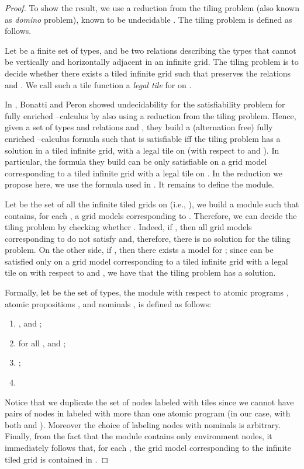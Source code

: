\documentclass{LMCS}
\theoremstyle{plain}
\begin{document}
\begin{proof}
To show the result, we use a reduction from the tiling problem (also known as
\emph{domino} problem), known to be undecidable \cite{Ber66}. The tiling
problem is defined as follows.

Let  be a finite set of types, and  be two relations
describing the types that cannot be vertically and horizontally adjacent in an
infinite grid. The tiling problem is to decide whether there exists a tiled
infinite grid  such that  preserves the
relations  and . We call such a tile function a \emph{legal tile} for 
on .

In \cite{BP04}, Bonatti and Peron showed undecidability for the satisfiability
problem for fully enriched --calculus by also using a reduction from the
tiling problem. Hence, given a set of types  and relations  and , they
build a (alternation free) fully enriched --calculus formula 
such that  is satisfiable iff the tiling problem has a solution in a
tiled infinite grid, with a legal tile  on  (with respect to  and
). In particular, the formula they build can be only satisfiable on a grid
model  corresponding to a tiled infinite grid with a legal tile  on
. In the reduction we propose here, we use the formula  used in
\cite{BP04}. It remains to define the module.

Let  be the set of all the infinite tiled grids on 
(i.e., ), we build a module  such that
 contains, for each , a grid models corresponding to .
Therefore, we can decide the tiling problem by checking whether . Indeed, if , then all grid models
corresponding to  do not satisfy  and, therefore, there is no
solution for the tiling problem. On the other side, if , then there exists a model for ; since  can be
satisfied only on a grid model corresponding to a tiled infinite grid with a
legal tile on  with respect to  and , we have that the tiling problem
has a solution.

Formally, let  be the set of types, the module  with respect to atomic programs , atomic propositions , and nominals , is defined as follows:
\begin{enumerate}[]
\item
, 
and ;

\item
for all ,  and
;

\item
;

\item

\end{enumerate}

Notice that we duplicate the set of nodes labeled with tiles since
we cannot have pairs of nodes in  labeled with more than one
atomic program (in our case, with both  and ). Moreover
the choice of labeling nodes  with nominals is arbitrary.
Finally, from the fact that the module contains only environment
nodes, it immediately follows that, for each , the grid model
corresponding to the infinite tiled grid  is contained in
.
\end{proof}
\end{document}
